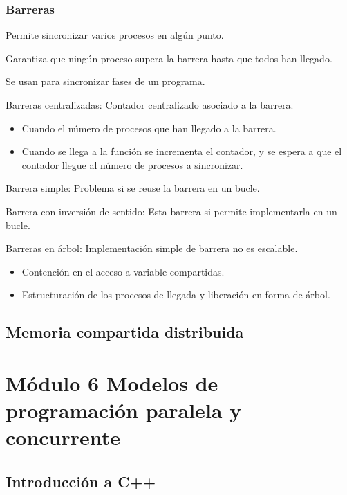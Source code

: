 \documentclass[12pt, twoside, openright]{report} %
\begin{document}
\subsection{Barreras}

Permite sincronizar varios procesos en algún punto.


    Garantiza que ningún proceso supera la barrera hasta que todos han
    llegado.

    Se usan para sincronizar fases de un programa.

    Barreras centralizadas: Contador centralizado asociado a la
    barrera.

    \begin{itemize}
    
    \item
      Cuando el número de procesos que han llegado a la barrera.
    \item
      Cuando se llega a la función se incrementa el contador, y se
      espera a que el contador llegue al número de procesos a
      sincronizar.
    \end{itemize}

    Barrera simple: Problema si se reuse la barrera en un bucle.

    Barrera con inversión de sentido: Esta barrera si permite
    implementarla en un bucle.

    Barreras en árbol: Implementación simple de barrera no es
    escalable.

    \begin{itemize}
    
    \item
      Contención en el acceso a variable compartidas.
    \item
      Estructuración de los procesos de llegada y liberación en forma
      de árbol.
    \end{itemize}

    
  
\section{Memoria compartida distribuida}



  \chapter{Módulo 6 Modelos de programación paralela y concurrente}

\section{Introducción a C++}
\end{document}
